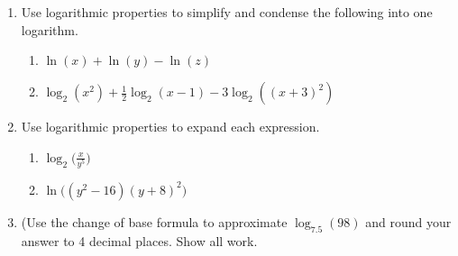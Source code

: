 

\begin{enumerate}
\item Use logarithmic properties to simplify and condense the following into one logarithm.
\begin{enumerate}
\item $\ln(x)+\ln(y)-\ln(z)$
\vfill
\item $\displaystyle \log_2(x^2)+\frac{1}{2}\log_2(x-1)-3\log_2((x+3)^2)$
\vfill

\end{enumerate}


\item Use logarithmic properties to expand each expression.  
\begin{enumerate}
\item $\displaystyle \log_2\Big(\frac{x}{y^5}\Big)$
\vfill
\item $\displaystyle \ln \Big((y^2-16)(y+8)^2  \Big)$
\vfill

\end{enumerate}

\item (Use the change of base formula to approximate $\log_{7.5}(98)$ and round your answer to 4 decimal places.  Show all work.
\vfill







\end{enumerate}



